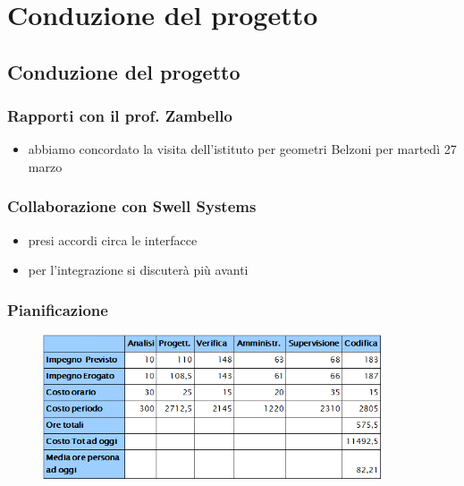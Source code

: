 
\section{Conduzione del progetto}

\subsection*{Conduzione del progetto}

\begin{frame}
\frametitle{Rapporti con il prof. Zambello}

\begin{itemize}
\item abbiamo concordato la visita dell'istituto per geometri Belzoni per martedì 27 marzo
\end{itemize}

\end{frame}

\begin{frame}
\frametitle{Collaborazione con Swell Systems}

\begin{itemize}
\item presi accordi circa le interfacce
\item per l'integrazione si discuterà più avanti
\end{itemize}

\end{frame}

\begin{frame}
\frametitle{Pianificazione}

\begin{figure}
  \includegraphics[width=10cm]{img/Consuntivo.png}
\end{figure}

\end{frame}

